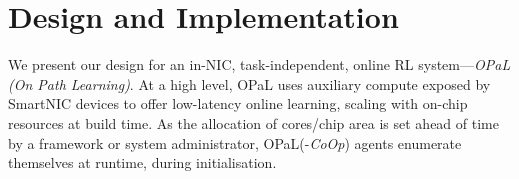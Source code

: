 \documentclass[
conference
,10pt
]{IEEEtran}
\newcommand{\approach}{On Path Learning}
\newcommand{\approachshort}{OPaL}
\newcommand{\Coopfw}{\emph{CoOp}}
\begin{document}


\section{Design and Implementation}\label{sec:design}
We present our design for an in-NIC, task-independent, online RL system---\emph{\approachshort{} (\approach)}.
At a high level, \approachshort{} uses auxiliary compute exposed by SmartNIC devices to offer low-latency online learning, scaling with on-chip resources at build time.
As the allocation of cores/chip area is set ahead of time by a framework or system administrator, \approachshort{}(-\Coopfw) agents enumerate themselves at runtime, during initialisation.
\end{document}
